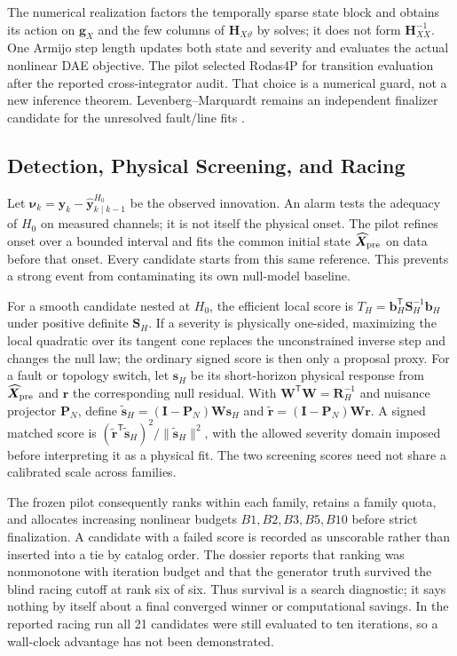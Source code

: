The numerical realization factors the temporally sparse state block and obtains its action on $\bm g_X$ and the few columns of $\bm H_{X\vartheta}$ by solves; it does not form $\bm H_{XX}^{-1}$. One Armijo step length updates both state and severity and evaluates the actual nonlinear DAE objective. The pilot selected Rodas4P for transition evaluation after the reported cross-integrator audit. That choice is a numerical guard, not a new inference theorem. Levenberg--Marquardt remains an independent finalizer candidate for the unresolved fault/line fits \cite{bell1994ieks,sarkka2020linesearch}.

\subsection{Detection, Physical Screening, and Racing}

Let $\bm\nu_k=\bm y_k-\widehat{\bm y}^{H_0}_{k\mid k-1}$ be the observed innovation. An alarm tests the adequacy of $H_0$ on measured channels; it is not itself the physical onset. The pilot refines onset over a bounded interval and fits the common initial state $\widehat{\bm X}_{\rm pre}$ on data before that onset. Every candidate starts from this same reference. This prevents a strong event from contaminating its own null-model baseline.

For a smooth candidate nested at $H_0$, the efficient local score is $T_H=\bm b_H^{\mathsf T}\bm S_H^{-1}\bm b_H$ under positive definite $\bm S_H$. If a severity is physically one-sided, maximizing the local quadratic over its tangent cone replaces the unconstrained inverse step and changes the null law; the ordinary signed score is then only a proposal proxy. For a fault or topology switch, let $\bm s_H$ be its short-horizon physical response from $\widehat{\bm X}_{\rm pre}$ and $\bm r$ the corresponding null residual. With $\bm W^{\mathsf T}\bm W=\bm R_H^{-1}$ and nuisance projector $\bm P_N$, define $\widetilde{\bm s}_H=(\bm I-\bm P_N)\bm W\bm s_H$ and $\widetilde{\bm r}=(\bm I-\bm P_N)\bm W\bm r$. A signed matched score is $(\widetilde{\bm r}^{\mathsf T}\widetilde{\bm s}_H)^2/\|\widetilde{\bm s}_H\|^2$, with the allowed severity domain imposed before interpreting it as a physical fit. The two screening scores need not share a calibrated scale across families.

The frozen pilot consequently ranks within each family, retains a family quota, and allocates increasing nonlinear budgets $B1,B2,B3,B5,B10$ before strict finalization. A candidate with a failed score is recorded as unscorable rather than inserted into a tie by catalog order. The dossier reports that ranking was nonmonotone with iteration budget and that the generator truth survived the blind racing cutoff at rank six of six. Thus survival is a search diagnostic; it says nothing by itself about a final converged winner or computational savings. In the reported racing run all 21 candidates were still evaluated to ten iterations, so a wall-clock advantage has not been demonstrated.

